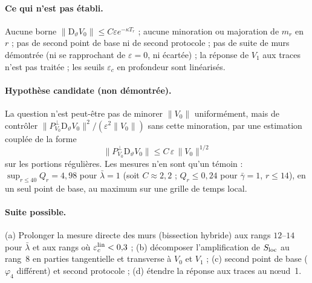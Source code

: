 \documentclass[11pt,a4paper]{article}
\theoremstyle{remark}
\newcommand{\norm}[1]{\lVert #1\rVert}
\newcommand{\vth}{\vartheta}
\newcommand{\D}{\mathrm D}
\begin{document}
\paragraph{Ce qui n'est pas \'etabli.} Aucune borne $\norm{\D_\vth V_0}\le C\varepsilon e^{-\kappa T_r}$ ; aucune minoration ou majoration de $m_r$ en $r$ ; pas de second point de base ni de second protocole ; pas de suite de murs d\'emontr\'ee (ni se rapprochant de $\varepsilon=0$, ni \'ecart\'ee) ; la r\'eponse de $V_1$ aux traces n'est pas trait\'ee ; les seuils $\varepsilon_c$ en profondeur sont lin\'earis\'es.

\paragraph{Hypoth\`ese candidate (non d\'emontr\'ee).} La question n'est peut-\^etre pas de minorer $\lVert V_0\rVert$ uniform\'ement, mais de contr\^oler $\lVert P^\perp_{V_0}\D_\vth V_0\rVert^2/(\varepsilon^2\lVert V_0\rVert)$ sans cette minoration, par une estimation coupl\'ee de la forme
\[ \lVert P^\perp_{V_0}\D_\vth V_0\rVert\le C\,\varepsilon\,\lVert V_0\rVert^{1/2} \]
sur les portions r\'eguli\`eres. Les mesures n'en sont qu'un t\'emoin : $\sup_{r\le40}Q_r=4{,}98$ pour $\bar\lambda=1$ (soit $C\approx2{,}2$ ; $Q_r\le0{,}24$ pour $\bar\gamma=1$, $r\le14$), en un seul point de base, au maximum sur une grille de temps local.

\paragraph{Suite possible.} (a) Prolonger la mesure directe des murs (bissection hybride) aux rangs $12$--$14$ pour $\bar\lambda$ et aux rangs o\`u $\varepsilon_c^{\rm lin}<0{,}3$ ; (b) d\'ecomposer l'amplification de $S_{\rm loc}$ au rang~8 en parties tangentielle et transverse \`a $V_0$ et $V_1$ ; (c) second point de base ($\varphi_4$ diff\'erent) et second protocole ; (d) \'etendre la r\'eponse aux traces au n\oe ud~1.
\end{document}
